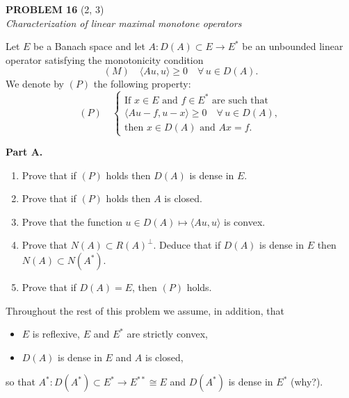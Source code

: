 \documentclass[12pt]{article}
\newcommand{\ip}[2]{\langle #1, #2 \rangle}
\begin{document}
\bigskip

\noindent\textbf{PROBLEM 16} (2, 3)\\[4pt]
\textit{Characterization of linear maximal monotone operators}

\medskip

Let $E$ be a Banach space and let $A : D(A) \subset E \to E^*$ be an unbounded linear
operator satisfying the monotonicity condition
\[
(M)\quad \ip{Au}{u} \ge 0 \quad \forall\, u \in D(A).
\]
We denote by $(P)$ the following property:
\[
(P)\quad
\begin{cases}
\text{If } x \in E \text{ and } f \in E^* \text{ are such that}\\
\ip{Au - f}{u - x} \ge 0 \quad \forall\, u \in D(A),\\
\text{then } x \in D(A) \text{ and } Ax = f.
\end{cases}
\]

\medskip
 
\noindent\textbf{Part A.}
 
\begin{enumerate}
\item Prove that if $(P)$ holds then $D(A)$ is dense in $E$.
 
\noindent[\textit{Hint:} Show that if $f \in E^*$ and $\ip{f}{u} = 0$ $\forall\, u \in D(A)$, then $f = 0$.]
 
\item Prove that if $(P)$ holds then $A$ is closed.
 
\item Prove that the function $u \in D(A) \mapsto \ip{Au}{u}$ is convex.
 
\item Prove that $N(A) \subset R(A)^\perp$. Deduce that if $D(A)$ is dense in $E$ then $N(A) \subset N(A^*)$.
 
\item Prove that if $D(A) = E$, then $(P)$ holds.
\end{enumerate}
 
\noindent Throughout the rest of this problem we assume, in addition, that
\begin{itemize}
\item[(i)] $E$ is reflexive, $E$ and $E^*$ are strictly convex,
\item[(ii)] $D(A)$ is dense in $E$ and $A$ is closed,
\end{itemize}
so that $A^* : D(A^*) \subset E^* \to E^{**} \cong E$ and $D(A^*)$ is dense in $E^*$ (why?).
 
\end{document}
